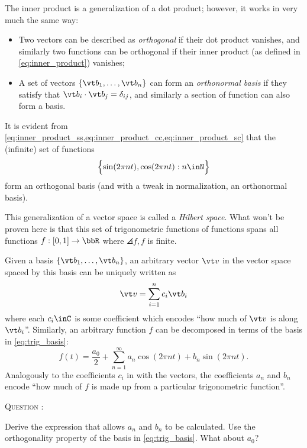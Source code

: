 \documentclass[
  a4paper,             %
  11pt,                %
  oneside,             %
  onecolumn,           %
  bibliography=totoc,  %
  final,               %
]{scrartcl}
\newcounter{question}
\newenvironment{question}{%
  \stepcounter{question}%
  \begin{tcolorbox}[
      colframe=black,
      sharp corners=all,
      boxsep=0.5ex,
    ]
    \noindent\textsc{\large Question \arabic{question}:} %
}{%
  \end{tcolorbox}%
}
\begin{document}
The inner product is a generalization of a dot product; however, it works in
very much the same way:
\begin{itemize}
\item Two vectors can be described as \emph{orthogonal} if their dot product
  vanishes, and similarly two functions can be orthogonal if their inner product
  (as defined in \cref{eq:inner_product}) vanishes;
\item A set of vectors \(\{\vt b_{1}, \dots, \vt b_{n}\}\) can form an
  \emph{orthonormal basis} if they satisfy that \(\vt b_{i} \cdot \vt b_{j} =
  \delta_{ij}\), and similarly a section of function can also form a basis.
\end{itemize}

It is evident from
\cref{eq:inner_product_ss,eq:inner_product_cc,eq:inner_product_sc} that the
(infinite) set of functions
\begin{equation}
  \label{eq:trig_basis}
  \Bigl\{ \sin(2 \pi n t), \cos(2 \pi n t) : n \inN \Bigr\}
\end{equation}
form an orthogonal basis (and with a tweak in normalization, an orthonormal
basis).

This generalization of a vector space is called a \emph{Hilbert space}.  What
won't be proven here is that this set of trigonometric functions of functions
spans all functions \(f : [0, 1] \to \bbR\) where \(\angles{f, f}\) is finite.

Given a basis \(\{\vt b_{1}, \dots, \vt b_{n}\}\), an arbitrary vector \(\vt v\)
in the vector space spaced by this basis can be uniquely written as
\begin{equation}
  \vt v = \sum_{i=1}^{n} c_{i} \vt b_{i}
\end{equation}
where each \(c_{i} \inC\) is some coefficient which encodes \enquote{how much of
  \(\vt v\) is along \(\vt b_{i}\)}.  Similarly, an arbitrary function \(f\) can
be decomposed in terms of the basis in \cref{eq:trig_basis}:
\begin{equation}
  \label{eq:real_fourier_series}
  f(t) = \frac{a_{0}}{2} + \sum_{n=1}^{\infty} a_{n} \cos(2\pi n t) + b_{n} \sin(2\pi n t).
\end{equation}
Analogously to the coefficients \(c_{i}\) in with the vectors, the coefficients
\(a_{n}\) and \(b_{n}\) encode \enquote{how much of \(f\) is made up from a
  particular trigonometric function}.

\begin{question}
  Derive the expression that allows \(a_{n}\) and \(b_{n}\) to be calculated.
  Use the orthogonality property of the basis in \cref{eq:trig_basis}.  What
  about \(a_{0}\)?
\end{question}
\end{document}
